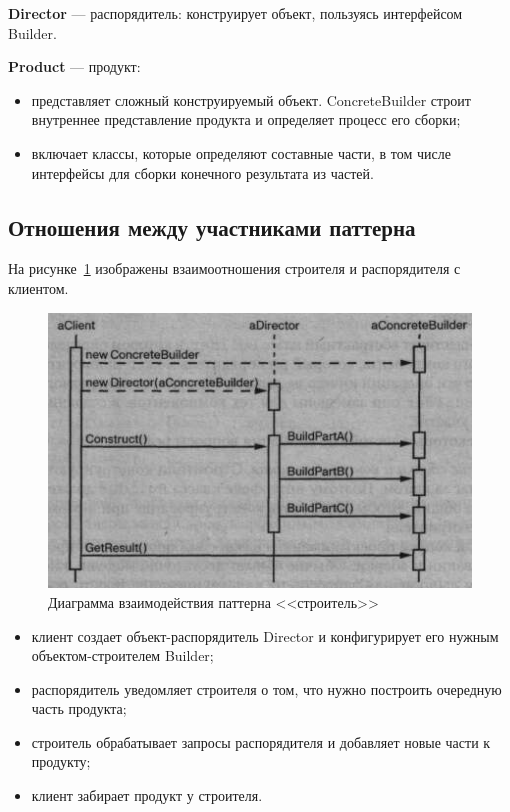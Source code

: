 \textbf{Director} --- распорядитель: конструирует объект, пользуясь интерфейсом Builder.

\textbf{Product} --- продукт:
\begin{itemize}
\item
  представляет сложный конструируемый объект.
  ConcreteBuilder строит внутреннее представление продукта
  и определяет процесс его сборки;
\item
  включает классы, которые определяют составные части,
  в том числе интерфейсы для сборки конечного результата из частей.
\end{itemize}

\subsection{Отношения между участниками паттерна}
На рисунке~\ref{fig:builder_uml_2} изображены взаимоотношения
строителя и распорядителя с клиентом.

\begin{figure}[h!]
  \centering
  \includegraphics[width=150mm]{pic/builder_uml_2.png}
  \caption{Диаграмма взаимодействия паттерна <<строитель>>}
  \label{fig:builder_uml_2}
\end{figure}

\begin{itemize}
\item
клиент создает объект-распорядитель Director и конфигурирует его
нужным объектом-строителем Builder;
\item
  распорядитель уведомляет строителя о том, что нужно построить 
  очередную часть продукта;
\item
  строитель обрабатывает запросы распорядителя и добавляет новые
  части к продукту;
\item
  клиент забирает продукт у строителя.
\end{itemize}

